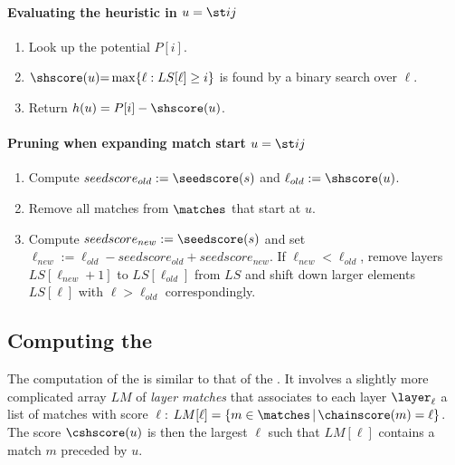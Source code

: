 \paragraph{Evaluating the heuristic in $u = \st ij$}
\begin{samepage}
\newcommand{\algletter}{E}
\begin{enumerate}
  \item Look up the potential $P[i]$.
  \item \label{GLOBALstep:bin-search} $\shscore(u) {=} \max \{\ell : LS[\ell] \geq i\}$ is found by a binary search over $\ell$.
  \item Return $h(u) = P[i] - \shscore(u)$.
\end{enumerate}
\end{samepage}

\paragraph{Pruning when expanding match start $u = \st ij$}
\begin{samepage}
\newcommand{\algletter}{P}
\begin{enumerate}
  \item Compute $seedscore_{old} := \seedscore(s)$ and
        $\ell_{old} := \shscore(u)$.
  \item Remove all matches from $\matches$ that start at $u$.
  \item Compute $seedscore_{new} := \seedscore(s)$ and
        set $\ell_{new} := \ell_{old} - seedscore_{old} + seedscore_{new}$.
        If $\ell_{new} < \ell_{old}$,
        remove layers $LS[\ell_{new}+1]$ to
        $LS[\ell_{old}]$ from $LS$ and shift down larger elements $LS[\ell]$
        with $\ell > \ell_{old}$ correspondingly.
\end{enumerate}
\end{samepage}

\subsection{Computing the \csh} \label{GLOBALsec:compute-csh}

The computation of the \csh is similar to that of the \sh. It involves a
slightly more complicated array $LM$ of \emph{layer matches} that associates to
each layer $\layer_\ell$ a list of matches with score $\ell$:
$LM[\ell] = \{m\in \matches \,|\, \chainscore(m) = \ell\}$.  The score
$\cshscore(u)$ is then the largest $\ell$ such that $LM[\ell]$ contains a match
$m$ preceded by $u$.

